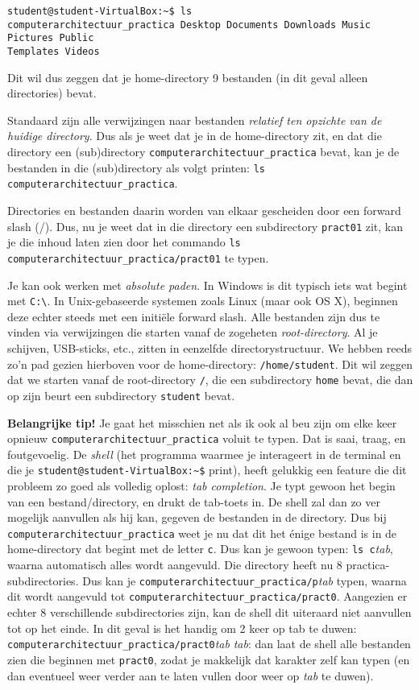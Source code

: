 \documentclass[a4paper,twoside,openany]{memoir}
\begin{document}
\begin{verbatim}
student@student-VirtualBox:~$ ls
computerarchitectuur_practica Desktop Documents Downloads Music Pictures Public
Templates Videos
\end{verbatim}

Dit wil dus zeggen dat je home-directory 9 bestanden (in dit geval alleen
directories) bevat.

Standaard zijn alle verwijzingen naar bestanden \emph{relatief ten opzichte van
de huidige directory}. Dus als je weet dat je in de home-directory zit, en dat
die directory een (sub)directory \verb!computerarchitectuur_practica! bevat, kan
je de bestanden in die (sub)directory als volgt printen: \verb!ls computerarchitectuur_practica!.

Directories en bestanden daarin worden van elkaar gescheiden door een forward
slash (/). Dus, nu je weet dat in die directory een subdirectory \verb!pract01!
zit, kan je die inhoud laten zien door het commando  \verb!ls computerarchitectuur_practica/pract01!
te typen.

Je kan ook werken met \emph{absolute paden}. In Windows is dit typisch iets wat
begint met \verb!C:\!. In Unix-gebaseerde systemen zoals Linux (maar ook OS X),
beginnen deze echter steeds met een initiële forward slash. Alle bestanden zijn
dus te vinden via verwijzingen die starten vanaf de zogeheten
\emph{root-directory}. Al je schijven, USB-sticks, etc., zitten in eenzelfde
directorystructuur. We hebben reeds zo'n pad gezien hierboven voor de
home-directory: \verb!/home/student!. Dit wil zeggen dat we starten vanaf de
root-directory \verb!/!, die een subdirectory \verb!home! bevat, die dan op zijn
beurt een subdirectory \verb!student! bevat.

\textbf{Belangrijke tip!} Je gaat het misschien net als ik ook al beu zijn om
elke keer opnieuw \verb!computerarchitectuur_practica! voluit te typen. Dat is
saai, traag, en foutgevoelig. De \emph{shell} (het programma waarmee je
interageert in de terminal en die je \verb!student@student-VirtualBox:~$!
print), heeft gelukkig een feature die dit probleem zo goed als volledig oplost:
\emph{tab completion}. Je typt gewoon het begin van een bestand/directory, en
drukt de tab-toets in. De shell zal dan zo ver mogelijk aanvullen als hij kan,
gegeven de bestanden in de directory. Dus bij
\verb!computerarchitectuur_practica! weet je nu dat dit het \'enige bestand is
in de home-directory dat begint met de letter \verb!c!. Dus kan je gewoon typen:
\verb!ls c!\emph{tab}, waarna automatisch alles wordt aangevuld. Die directory
heeft nu 8 practica-subdirectories. Dus kan je
\verb!computerarchitectuur_practica/p!\emph{tab} typen, waarna dit wordt
aangevuld tot \verb!computerarchitectuur_practica/pract0!. Aangezien er echter 8
verschillende subdirectories zijn, kan de shell dit uiteraard niet aanvullen tot
op het einde. In dit geval is het handig om 2 keer op tab te duwen:
\verb!computerarchitectuur_practica/pract0!\emph{tab} \emph{tab}: dan laat de
shell alle bestanden zien die beginnen met \verb!pract0!, zodat je makkelijk dat
karakter zelf kan typen (en dan eventueel weer verder aan te laten vullen door
weer op \emph{tab} te duwen).
\end{document}

